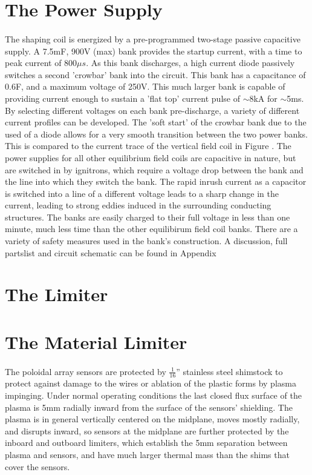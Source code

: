 \section{The Power Supply}
\paragraph{}The shaping coil is energized by a pre-programmed two-stage passive capacitive supply.  A 7.5mF, 900V (max) bank provides the startup current, with a time to peak current of $800\mu s$.  As this bank discharges, a high current diode passively switches a second 'crowbar' bank into the circuit.  This bank has a capacitance of 0.6F, and a maximum voltage of 250V.  This much larger bank is capable of providing current enough to sustain a 'flat top' current pulse of $\sim$8kA for $\sim$5ms.  By selecting different voltages on each bank pre-discharge, a variety of different current profiles can be developed.  The 'soft start' of the crowbar bank due to the used of a diode allows for a very smooth transition between the two power banks.  This is compared to the current trace of the vertical field coil in Figure .  The power supplies for all other equilibrium field coils are capacitive in nature, but are switched in by ignitrons, which require a voltage drop between the bank and the line into which they switch the bank.  The rapid inrush current as a capacitor is switched into a line of a different voltage leads to a sharp change in the current, leading to strong eddies induced in the surrounding conducting structures.  The banks are easily charged to their full voltage in less than one minute, much less time than the other equilibirum field coil banks.  There are a variety of safety measures used in the bank's construction.  A discussion, full partslist and circuit schematic can be found in Appendix 
\section{The Limiter}


\section{The Material Limiter}
\paragraph{}The poloidal array sensors are protected by $\frac{1}{16}$'' stainless steel shimstock to protect against damage to the wires or ablation of the plastic forms by plasma impinging.  Under normal operating conditions the last closed flux surface of the plasma is 5mm radially inward from the surface of the sensors' shielding.  The plasma is in general vertically centered on the midplane, moves mostly radially, and disrupts inward, so sensors at the midplane are further protected by the inboard and outboard limiters, which establish the 5mm separation between plasma and sensors, and have much larger thermal mass than the shims that cover the sensors.

